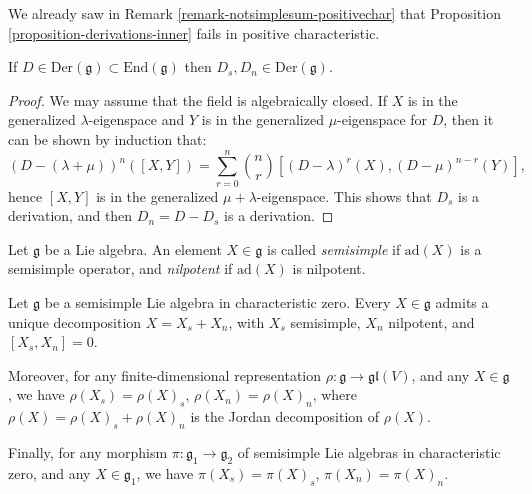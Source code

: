 \begin{remark}
 \label{remark-failure-inner}
 We already saw in Remark \ref{remark-notsimplesum-positivechar} that Proposition \ref{proposition-derivations-inner} fails in positive characteristic.
\end{remark}



\begin{proposition}
\label{proposition-Jordan-derivations}
 If $D\in \text{Der}(\mathfrak g)\subset \text{End}(\mathfrak g)$ then $D_s,D_n\in\text{Der}(\mathfrak g)$.
\end{proposition}

\begin{proof}
We may assume that the field is algebraically closed. 
 If $X$ is in the generalized $\lambda$-eigenspace and $Y$ is in the generalized $\mu$-eigenspace for $D$, then it can be shown by induction that:
$$ (D-(\lambda+\mu))^n([X,Y]) = \sum_{r=0}^n \binom{n}{r} [(D-\lambda)^r(X),(D-\mu)^{n-r}(Y)],$$
hence $[X,Y]$ is in the generalized $\mu+\lambda$-eigenspace. This shows that $D_s$ is a derivation, and then $D_n=D-D_s$ is a derivation.
\end{proof}


\begin{definition}
\label{definition-nilpotent-semisimple-element}
Let $\mathfrak g$ be a Lie algebra. An element $X\in \mathfrak g$ is called \emph{semisimple} if $\text{ad}(X)$ is a semisimple operator, and \emph{nilpotent} if $\text{ad}(X)$ is nilpotent.
\end{definition}

\begin{theorem}
\label{theorem-Jordan-Chevalley}
Let $\mathfrak g$ be a semisimple Lie algebra in characteristic zero. Every $X\in \mathfrak g$ admits a unique decomposition $X=X_s + X_n$, with $X_s$ semisimple, $X_n$ nilpotent, and $[X_s,X_n]=0$.

Moreover, for any finite-dimensional representation $\rho:\mathfrak g \to \mathfrak{gl}(V)$, and any $X\in \mathfrak g$, we have
$\rho(X_s) = \rho(X)_s$, $\rho(X_n)=\rho(X)_n$, where $\rho(X)=\rho(X)_s+\rho(X)_n$ is the Jordan decomposition of $\rho(X)$.

Finally, for any morphism $\pi: \mathfrak g_1 \to \mathfrak g_2$ of semisimple Lie algebras in characteristic zero, and any $X\in \mathfrak g_1$, we have $\pi(X_s) = \pi(X)_s$, $\pi(X_n)=\pi(X)_n$.
\end{theorem}


